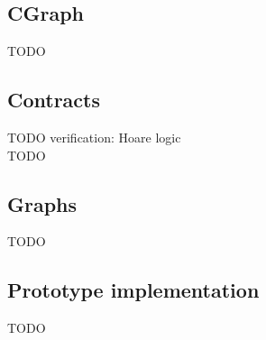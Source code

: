 \subsection{CGraph}

TODO

\subsection{Contracts}

TODO verification: Hoare logic \\
TODO

\subsection{Graphs}

TODO

\subsection{Prototype implementation}

TODO
